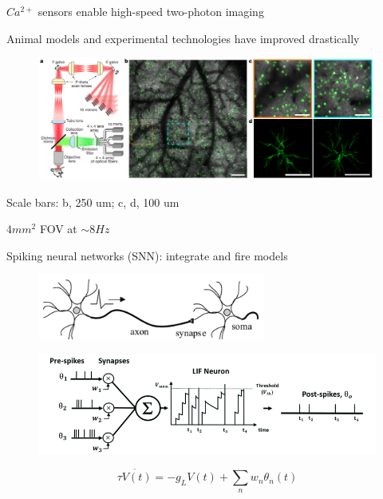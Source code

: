 \documentclass[aspectratio=169]{beamer}
\begin{document}
\begin{frame}{$Ca^{2+}$ sensors enable high-speed two-photon imaging}

Animal models and experimental technologies have improved drastically

\begin{figure}
\centering
\includegraphics[width=140mm]{figure-16}
\end{figure}
Scale bars: b, 250 um; c, d, 100 um

$4\si{mm}^{2}$ FOV at $\sim 8\si{Hz}$

\end{frame}

\begin{frame}{Spiking neural networks (SNN): integrate and fire models}


\begin{figure}
\centering
\includegraphics[width=75mm]{figure-15}
\end{figure}

\begin{figure}
\centering
\includegraphics[width=115mm]{figure-14}
\end{figure}

\begin{equation*}
\tau\dot{V(t)} = -g_{L}V(t) + \sum_{n} w_{n}\theta_{n}(t)
\end{equation*}

\end{frame}
\end{document}
